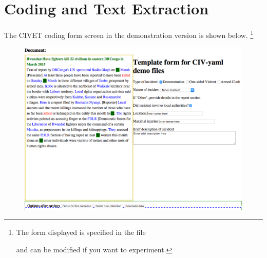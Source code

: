 \documentclass[letterpaper,10pt,english]{sphinxmanual}
\begin{document}
\chapter{Coding and Text Extraction}
\label{extraction::doc}\label{extraction:coding-and-text-extraction}
The CIVET coding form screen in the demonstration version is shown below. \footnote{
The form displayed is specified in the file


and can be modified if you want to experiment.
}
\begin{figure}[htbp]
\centering

\includegraphics[width=0.800\linewidth]{civetcoder.png}
\end{figure}
\end{document}
